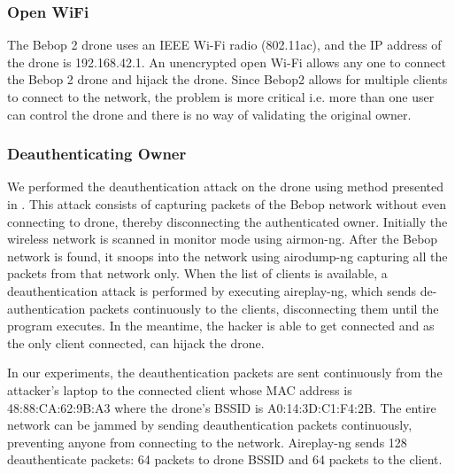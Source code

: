 \documentclass[conference]{IEEEtran}
\begin{document}
\subsubsection{Open WiFi}
The Bebop 2 drone uses an IEEE Wi-Fi radio (802.11ac), and the IP address of the drone is 192.168.42.1. 
An unencrypted open Wi-Fi allows any one to connect the Bebop 2 drone and hijack the drone. Since Bebop2 allows for multiple clients to connect to the network, the problem is more critical i.e. more than one user can control the drone and there is no way of validating the original owner. 

\subsubsection{Deauthenticating Owner}
We performed the deauthentication attack on the drone using method presented in \cite{aircrack}.
This attack consists of capturing packets of the Bebop network without even connecting to drone, thereby disconnecting the authenticated owner.
Initially the wireless network is scanned in monitor mode using airmon-ng. After the Bebop network is found, it snoops into the network using airodump-ng capturing all the packets from that network only. 
When the list of clients is available, a deauthentication attack is performed by executing aireplay-ng, which sends de-authentication packets continuously to the clients, disconnecting them until the program executes.
In the meantime, the hacker is able to get connected and as the only client connected, 
can hijack the drone.

In our experiments, the deauthentication packets are sent continuously from the attacker's laptop to the connected client whose MAC address is 48:88:CA:62:9B:A3 where the drone's BSSID is A0:14:3D:C1:F4:2B.
The entire network can be jammed by sending deauthentication packets continuously, preventing anyone from connecting to the network. 
Aireplay-ng sends 128 deauthenticate packets: 64 packets to drone BSSID and 64 packets to the client. 
\end{document}
